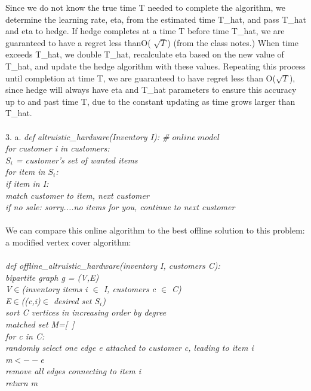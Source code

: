 \documentclass[11pt, oneside]{article}   	%
\begin{document}
\indent Since we do not know the true time T needed to complete the algorithm, we determine the learning rate, eta,  from the estimated time T\_hat, and pass T\_hat and eta to hedge.  If hedge completes at a time T before time T\_hat, we are guaranteed to have a regret less thanO( $\sqrt{T}$) (from the class notes.)  When time exceeds T\_hat, we double T\_hat, recalculate eta based on the new value of T\_hat, and update the hedge algorithm with these values.  Repeating this process until completion at time T, we are guaranteed to have regret less than O($\sqrt{T}$), since hedge will always have eta and T\_hat  parameters to ensure this accuracy up to and past time T, due to the constant updating as time grows larger than T\_hat.\\
\\
3.  a.\textit{  def altruistic\_hardware(Inventory I): \# $online\ model$\\
\indent\indent\indent for customer i in customers:\\
\indent\indent\indent\indent $S_i$ = customer's set of wanted items\\
\indent\indent\indent\indent for item in $S_i$:\\
\indent\indent\indent\indent\indent if item in I:\\
\indent\indent\indent\indent\indent\indent match customer to item, next customer\\
\indent\indent\indent\indent if no sale: sorry....no items for you, continue to next customer}\\
\\
\indent We can compare this online algorithm to the best offline solution to this problem: a modified vertex cover algorithm:\\
\\
\indent\textit{ def offline\_altruistic\_hardware(inventory I, customers C):\\
\indent\indent bipartite graph g = (V,E)\\
\indent\indent V$\in$(inventory items i $\in$ I, customers c $\in$ C)\\
\indent\indent E$\in$((c,i)$\in$ desired set $S_i$)\\
\indent\indent sort C vertices in increasing order by degree\\
\indent\indent matched set M=[\ ]\\
\indent\indent for c in C:\\
\indent\indent\indent randomly select one edge e attached to customer c, leading to item i\\
\indent\indent\indent m$<--$e\\
\indent\indent\indent remove all edges connecting to item i\\
\indent\indent return m}\\
\end{document}

